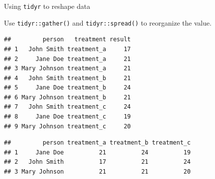 \documentclass[14pt,ignorenonframetext,]{bredelebeamer}
\newenvironment{Shaded}{\begin{snugshade}}{\end{snugshade}}
\newcommand{\KeywordTok}[1]{\textcolor[rgb]{0.94,0.87,0.69}{#1}}
\newcommand{\DataTypeTok}[1]{\textcolor[rgb]{0.87,0.87,0.75}{#1}}
\newcommand{\DecValTok}[1]{\textcolor[rgb]{0.86,0.86,0.80}{#1}}
\newcommand{\StringTok}[1]{\textcolor[rgb]{0.80,0.58,0.58}{#1}}
\newcommand{\OperatorTok}[1]{\textcolor[rgb]{0.94,0.94,0.82}{#1}}
\newcommand{\NormalTok}[1]{\textcolor[rgb]{0.80,0.80,0.80}{#1}}
\begin{document}
\begin{frame}[fragile]{Using \texttt{tidyr} to reshape data}

Use \texttt{tidyr::gather()} and \texttt{tidyr::spread()} to reorganize
the value.

\begin{Shaded}
\end{Shaded}

\begin{verbatim}
##         person   treatment result
## 1   John Smith treatment_a     17
## 2     Jane Doe treatment_a     21
## 3 Mary Johnson treatment_a     21
## 4   John Smith treatment_b     21
## 5     Jane Doe treatment_b     24
## 6 Mary Johnson treatment_b     21
## 7   John Smith treatment_c     24
## 8     Jane Doe treatment_c     19
## 9 Mary Johnson treatment_c     20
\end{verbatim}

\begin{Shaded}
\end{Shaded}

\begin{verbatim}
##         person treatment_a treatment_b treatment_c
## 1     Jane Doe          21          24          19
## 2   John Smith          17          21          24
## 3 Mary Johnson          21          21          20
\end{verbatim}

\end{frame}
\end{document}
